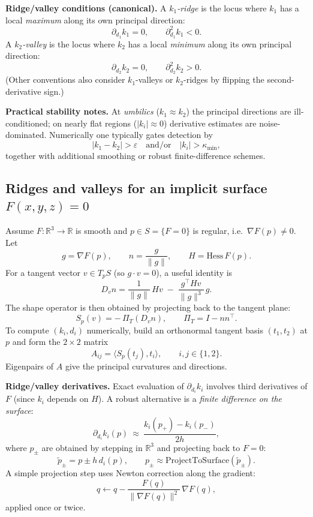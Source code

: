 \documentclass[12pt,a4paper]{article}
\theoremstyle{plain}
\theoremstyle{definition}      %
\begin{document}
\medskip
\noindent
\textbf{Ridge/valley conditions (canonical).}
A \emph{$k_1$-ridge} is the locus where $k_1$ has a local \emph{maximum} along its own principal direction:
\[
\partial_{d_1}k_1 = 0,
\qquad
\partial^2_{d_1}k_1 < 0.
\]
A \emph{$k_2$-valley} is the locus where $k_2$ has a local \emph{minimum} along its own principal direction:
\[
\partial_{d_2}k_2 = 0,
\qquad
\partial^2_{d_2}k_2 > 0.
\]
(Other conventions also consider $k_1$-valleys or $k_2$-ridges by flipping the second-derivative sign.)

\medskip
\noindent
\textbf{Practical stability notes.}
At \emph{umbilics} ($k_1\approx k_2$) the principal directions are ill-conditioned; on nearly flat regions
($|k_i|\approx 0$) derivative estimates are noise-dominated. Numerically one typically gates detection by
\[
|k_1-k_2|>\varepsilon
\quad\text{and/or}\quad
|k_i|>\kappa_{\min},
\]
together with additional smoothing or robust finite-difference schemes.

\subsection*{Ridges and valleys for an implicit surface $F(x,y,z)=0$}

Assume $F:\mathbb{R}^3\to\mathbb{R}$ is smooth and $p\in S=\{F=0\}$ is regular, i.e.\ $\nabla F(p)\neq 0$.
Let
\[
g=\nabla F(p),\qquad n=\frac{g}{\|g\|},\qquad H=\mathrm{Hess}\,F(p).
\]
For a tangent vector $v\in T_pS$ (so $g\cdot v=0$), a useful identity is
\[
D_v n
=
\frac{1}{\|g\|}\,H v
\;-\;
\frac{g^\top H v}{\|g\|^3}\,g.
\]
The shape operator is then obtained by projecting back to the tangent plane:
\[
S_p(v)= -\,\Pi_T(D_v n),
\qquad
\Pi_T = I - n n^\top.
\]
To compute $(k_i,d_i)$ numerically, build an orthonormal tangent basis $(t_1,t_2)$ at $p$ and form the
$2\times 2$ matrix
\[
A_{ij}=\langle S_p(t_j),t_i\rangle,\qquad i,j\in\{1,2\}.
\]
Eigenpairs of $A$ give the principal curvatures and directions.

\medskip
\noindent
\textbf{Ridge/valley derivatives.}
Exact evaluation of $\partial_{d_i}k_i$ involves third derivatives of $F$ (since $k_i$ depends on $H$).
A robust alternative is a \emph{finite difference on the surface}:
\[
\partial_{d_i}k_i(p)\ \approx\ \frac{k_i(p_+)-k_i(p_-)}{2h},
\]
where $p_\pm$ are obtained by stepping in $\mathbb{R}^3$ and projecting back to $F=0$:
\[
\tilde p_\pm = p \pm h\,d_i(p),
\qquad
p_\pm \approx \mathrm{ProjectToSurface}(\tilde p_\pm).
\]
A simple projection step uses Newton correction along the gradient:
\[
q \leftarrow q - \frac{F(q)}{\|\nabla F(q)\|^2}\,\nabla F(q),
\]
applied once or twice.
\end{document}
